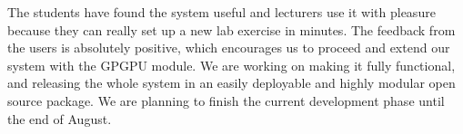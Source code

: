 \documentclass{llncs}
\begin{document}
The students have found the system useful and lecturers use it with pleasure because they can really set up a new lab exercise in minutes. The feedback from the users is absolutely positive, which encourages us to proceed and extend our system with the GPGPU module. We are working on making it fully functional, and releasing the whole system in an easily deployable and highly modular open source package. We are planning to finish the current development phase until the end of August. 





\end{document}
